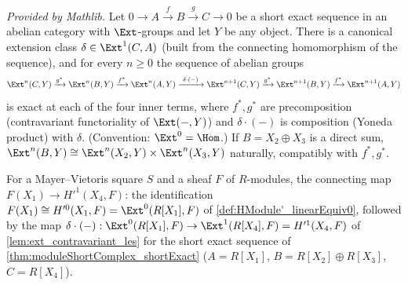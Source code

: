 \begin{lemma}
  \label{lem:ext_contravariant_les}
  \mathlibok
  \textit{Provided by Mathlib.}
  Let \(0 \to A \xrightarrow{f} B \xrightarrow{g} C \to 0\) be a short exact sequence in an
  abelian category with \(\Ext\)-groups and let \(Y\) be any object. There is a canonical
  extension class \(\delta \in \Ext^1(C, A)\) (built from the connecting homomorphism of the
  sequence), and for every \(n \ge 0\) the sequence of abelian groups
  \[
    \Ext^n(C,Y) \xrightarrow{g^*} \Ext^n(B,Y) \xrightarrow{f^*} \Ext^n(A,Y)
      \xrightarrow{\ \delta \cdot (-)\ } \Ext^{n+1}(C,Y) \xrightarrow{g^*} \Ext^{n+1}(B,Y)
      \xrightarrow{f^*} \Ext^{n+1}(A,Y)
  \]
  is exact at each of the four inner terms, where \(f^*, g^*\) are precomposition
  (contravariant functoriality of \(\Ext(-,Y)\)) and \(\delta \cdot (-)\) is composition
  (Yoneda product) with \(\delta\). (Convention: \(\Ext^0 = \Hom\).) If \(B = X_2 \oplus X_3\)
  is a direct sum, \(\Ext^n(B,Y) \cong \Ext^n(X_2,Y) \times \Ext^n(X_3,Y)\) naturally,
  compatibly with \(f^*, g^*\).
\end{lemma}

\begin{definition}
  \label{def:moduleDelta}
  \leanok
  For a Mayer--Vietoris square \(S\) and a sheaf \(F\) of \(R\)-modules, the connecting map
  \(F(X_1) \to H'^1(X_4, F)\): the identification
  \(F(X_1) \cong H'^0(X_1,F) = \Ext^0(R[X_1], F)\) of \ref{def:HModule'_linearEquiv0},
  followed by the map \(\delta \cdot (-) : \Ext^0(R[X_1],F) \to \Ext^1(R[X_4],F) = H'^1(X_4,F)\)
  of \ref{lem:ext_contravariant_les} for the short exact sequence of
  \ref{thm:moduleShortComplex_shortExact} (\(A = R[X_1]\), \(B = R[X_2] \oplus R[X_3]\),
  \(C = R[X_4]\)).
\end{definition}

